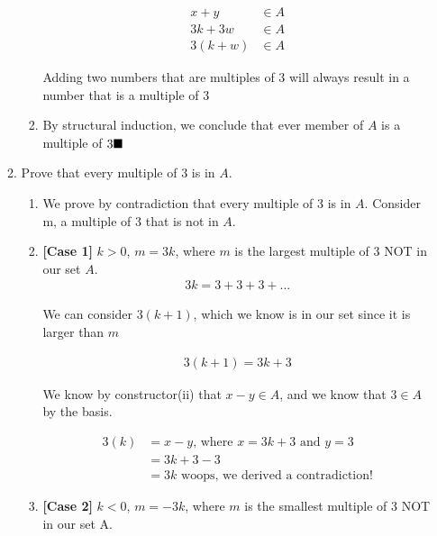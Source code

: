 \documentclass{article}
\begin{document}
\begin{itemize}
\begin{enumerate}[label=(\alph*)]
\begin{enumerate}[label=\arabic*.]
                \begin{align*}
                    x + y &\in A\\
                    3k + 3w &\in A\\
                    3(k+w) &\in A
                \end{align*}
                \begin{center}
                    Adding two numbers that are multiples of 3 will always result in a number that is a multiple of 3
                \end{center}
                \item By structural induction, we conclude that ever member of $A$ is a multiple of $3\hfill\blacksquare$
            \end{enumerate}
            \item Prove that every multiple of 3 is in $A$.
            \begin{enumerate}[label=\arabic*.]
                \item We prove by contradiction that every multiple of 3 is in $A$. Consider m, a multiple of 3 that is not in $A$.
                \item \textbf{[Case 1]} $k > 0$, $m = 3k$, where $m$ is the largest multiple of 3 NOT in our set $A$.
                \begin{align*}
                    3k = 3 + 3 + 3 + ...
                \end{align*}
                \begin{center}
                    We can consider $3(k+1)$, which we know is in our set since it is larger than $m$
                \end{center}
                \begin{align*}
                    3(k+1) = 3k+3
                \end{align*}
                \begin{center}
                    We know by constructor(ii) that $x-y \in A$, and we know that $3 \in A$ by the basis.
                \end{center}
                \begin{align*}
                    3(k) &= x - y \text{, where } x = 3k + 3 \text{ and } y = 3\\
                         &= 3k + 3 - 3\\
                         &= 3k \text{ woops, we derived a contradiction!}
                \end{align*}
                \item \textbf{[Case 2]} $k < 0$, $m = -3k$, where $m$ is the smallest multiple of 3 NOT in our set A.

\end{enumerate}
\end{enumerate}
\end{itemize}
\end{document}
